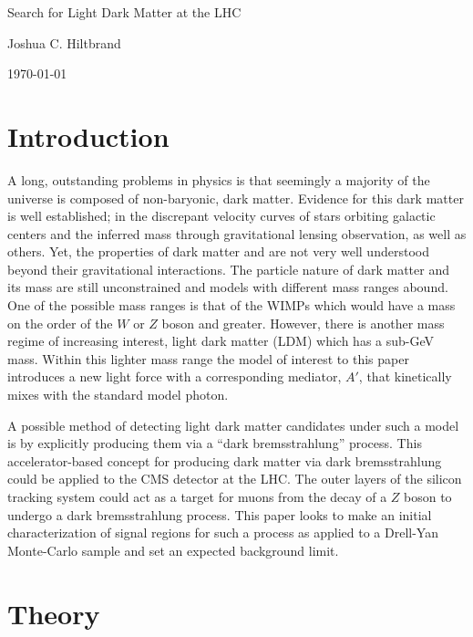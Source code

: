 \documentclass[a4paper,12pt]{article}
\begin{document}
\begin{center}
    \huge Search for Light Dark Matter at the LHC 
\end{center}
\begin{center}
    \large Joshua C. Hiltbrand
\end{center}
\begin{center}
    \small \today
\end{center}
\linenumbers

\section{Introduction}

    A long, outstanding problems in physics is that seemingly a majority of the
    universe is composed of non-baryonic, dark matter. Evidence for this dark
    matter is well established; in the discrepant velocity curves of stars
    orbiting galactic centers and the inferred mass through gravitational
    lensing observation, as well as others. Yet, the properties of dark matter
    and are not very well understood beyond their gravitational
    interactions. The particle nature of dark matter and its mass are still
    unconstrained and models with different mass ranges abound. One of the
    possible mass ranges is that of the WIMPs which would have a mass on the
    order of the $W$ or $Z$ boson and greater.  However, there is another mass
    regime of increasing interest, light dark matter (LDM) which has a sub-GeV
    mass. Within this lighter mass range the model of interest to this paper
    introduces a new light force with a corresponding mediator, $A'$, that
    kinetically mixes with the standard model photon.

    A possible method of detecting light dark matter candidates under such a
    model is by explicitly producing them via a ``dark bremsstrahlung'' process.
    This accelerator-based concept for producing dark matter via dark
    bremsstrahlung could be applied to the CMS detector at the LHC. The outer
    layers of the silicon tracking system could act as a target for muons from
    the decay of a $Z$ boson to undergo a dark bremsstrahlung process. This
    paper looks to make an initial characterization of signal regions for such a
    process as applied to a Drell-Yan Monte-Carlo sample and set an expected
    background limit.

\section{Theory}
\end{document}
